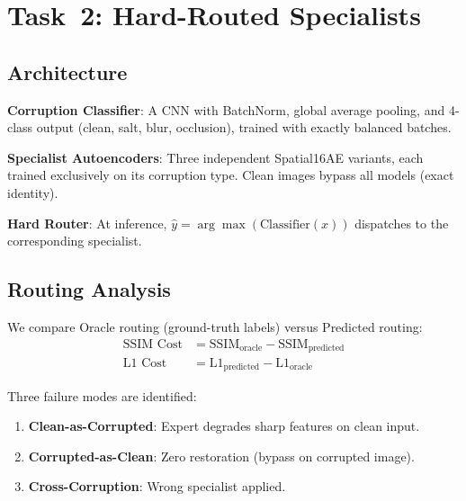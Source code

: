 \documentclass[conference]{IEEEtran}
\begin{document}

\section{Task~2: Hard-Routed Specialists}

\subsection{Architecture}
\textbf{Corruption Classifier}: A CNN with BatchNorm, global average pooling, and 4-class output (clean, salt, blur, occlusion), trained with exactly balanced batches.

\textbf{Specialist Autoencoders}: Three independent Spatial16AE variants, each trained exclusively on its corruption type. Clean images bypass all models (exact identity).

\textbf{Hard Router}: At inference, $\hat{y} = \arg\max(\text{Classifier}(x))$ dispatches to the corresponding specialist.

\subsection{Routing Analysis}
We compare Oracle routing (ground-truth labels) versus Predicted routing:
\begin{align}
\text{SSIM Cost} &= \text{SSIM}_{\text{oracle}} - \text{SSIM}_{\text{predicted}} \\
\text{L1 Cost} &= \text{L1}_{\text{predicted}} - \text{L1}_{\text{oracle}}
\end{align}

Three failure modes are identified:
\begin{enumerate}
\item \textbf{Clean-as-Corrupted}: Expert degrades sharp features on clean input.
\item \textbf{Corrupted-as-Clean}: Zero restoration (bypass on corrupted image).
\item \textbf{Cross-Corruption}: Wrong specialist applied.
\end{enumerate}
\end{document}
